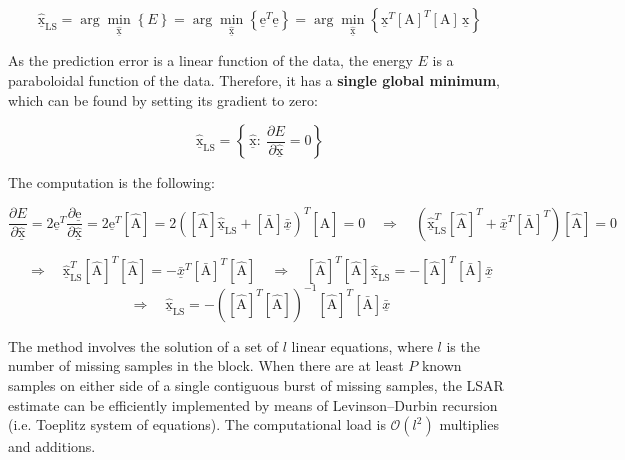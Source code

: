 \[
\underline{\hat{\mathrm{x}}}_{\mathrm{LS}}
= \arg \min_{\underline{\hat{\mathrm{x}}}} \left\{ E \right\}
= \arg \min_{\underline{\hat{\mathrm{x}}}} \left\{ \underline{\mathrm{e}}^T \underline{\mathrm{e}} \right\}
= \arg \min_{\underline{\hat{\mathrm{x}}}} \left\{ \underline{\mathrm{x}}^T \left[\mathrm{A}\right]^T \left[\mathrm{A}\right] \, \underline{\mathrm{x}} \right\}
\]

As the prediction error is a linear function of the data, the energy $E$ is a paraboloidal function of the data.
Therefore, it has a \textbf{single global minimum}, which can be found by setting its gradient to zero:

\[
\underline{\hat{\mathrm{x}}}_{\mathrm{LS}}
= \left\{ \, \underline{\hat{\mathrm{x}}}: \ \frac{\partial E}{\partial \underline{\hat{\mathrm{x}}}} = 0 \right\}
\]

\clearpage

The computation is the following:

\[
\frac{\partial E}{\partial \underline{\hat{\mathrm{x}}}}
= 2 \underline{\mathrm{e}}^T \frac{\partial \underline{\mathrm{e}}}{\partial \underline{\hat{\mathrm{x}}}}
= 2 \underline{\mathrm{e}}^T \left[\hat{\mathrm{A}}\right]
= 2 \left( \left[\hat{\mathrm{A}}\right] \underline{\hat{\mathrm{x}}}_{\mathrm{LS}} + \left[\bar{\mathrm{A}}\right] \underline{\bar{x}} \right)^T \left[\hat{\mathrm{A}}\right]
= 0
\quad \Rightarrow \quad
\left( \underline{\hat{\mathrm{x}}}_{\mathrm{LS}}^T \left[\hat{\mathrm{A}}\right]^T + \underline{\bar{x}}^T \left[\bar{\mathrm{A}}\right]^T \right) \left[\hat{\mathrm{A}}\right]
= 0
\]

\[
\Rightarrow \quad
\underline{\hat{\mathrm{x}}}_{\mathrm{LS}}^T \left[\hat{\mathrm{A}}\right]^T \left[\hat{\mathrm{A}}\right]
= - \underline{\bar{x}}^T \left[\bar{\mathrm{A}}\right]^T \left[\hat{\mathrm{A}}\right]
\quad \Rightarrow \quad
\left[\hat{\mathrm{A}}\right]^T \left[\hat{\mathrm{A}}\right] \underline{\hat{\mathrm{x}}}_{\mathrm{LS}}
= - \left[\hat{\mathrm{A}}\right]^T \left[\bar{\mathrm{A}}\right] \underline{\bar{x}}
\]
\[
\Rightarrow \quad
\underline{\hat{\mathrm{x}}}_{\mathrm{LS}}
= - \left( \left[\hat{\mathrm{A}}\right]^T \left[\hat{\mathrm{A}}\right] \right)^{-1} \left[\hat{\mathrm{A}}\right]^T \left[\bar{\mathrm{A}}\right] \underline{\bar{x}}
\]

The method involves the solution of a set of $l$ linear equations, where $l$ is the number of missing samples in the block.  
When there are at least $P$ known samples on either side of a single contiguous burst of missing samples, the LSAR estimate can be efficiently implemented by means of Levinson–Durbin recursion (i.e. Toeplitz system of equations). 
The computational load is $\mathcal{O}(l^2)$ multiplies and additions.

